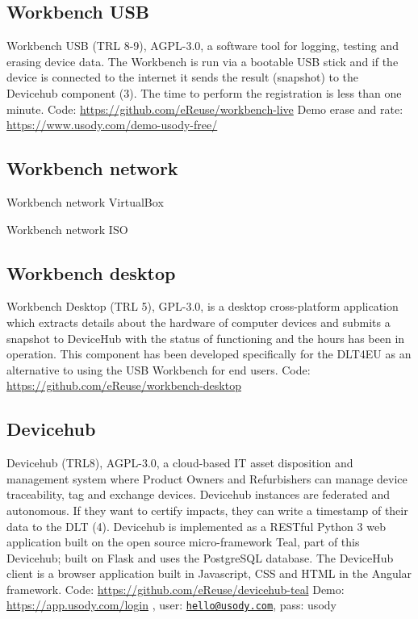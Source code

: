 \documentclass[
]{book}
\begin{document}
\hypertarget{workbench-usb}{%
\subsection{Workbench USB}\label{workbench-usb}}

Workbench USB (TRL 8-9), AGPL-3.0, a software tool for logging, testing and erasing device data. The Workbench is run via a bootable USB stick and if the device is connected to the internet it sends the result (snapshot) to the Devicehub component (3). The time to perform the registration is less than one minute.
Code: \url{https://github.com/eReuse/workbench-live}
Demo erase and rate: \url{https://www.usody.com/demo-usody-free/}

\hypertarget{workbench-network}{%
\subsection{Workbench network}\label{workbench-network}}

Workbench network VirtualBox

Workbench network ISO

\hypertarget{workbench-desktop}{%
\subsection{Workbench desktop}\label{workbench-desktop}}

Workbench Desktop (TRL 5), GPL-3.0, is a desktop cross-platform application which extracts details about the hardware of computer devices and submits a snapshot to DeviceHub with the status of functioning and the hours has been in operation. This component has been developed specifically for the DLT4EU as an alternative to using the USB Workbench for end users.
Code: \url{https://github.com/eReuse/workbench-desktop}

\hypertarget{devicehub}{%
\subsection{Devicehub}\label{devicehub}}

Devicehub (TRL8), AGPL-3.0, a cloud-based IT asset disposition and management system where Product Owners and Refurbishers can manage device traceability, tag and exchange devices. Devicehub instances are federated and autonomous. If they want to certify impacts, they can write a timestamp of their data to the DLT (4). Devicehub is implemented as a RESTful Python 3 web application built on the open source micro-framework Teal, part of this Devicehub; built on Flask and uses the PostgreSQL database. The DeviceHub client is a browser application built in Javascript, CSS and HTML in the Angular framework.
Code: \url{https://github.com/eReuse/devicehub-teal}
Demo: \url{https://app.usody.com/login} , user: \href{mailto:hello@usody.com}{\nolinkurl{hello@usody.com}}, pass: usody
\end{document}
